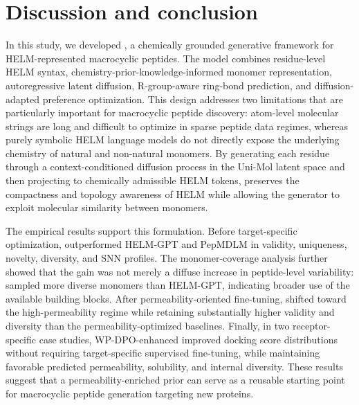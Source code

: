 \section{Discussion and conclusion}\label{sec:conclusion}

In this study, we developed \mytool, a chemically grounded generative framework for HELM-represented macrocyclic peptides. The model combines residue-level HELM syntax, chemistry-prior-knowledge-informed monomer representation, autoregressive latent diffusion, R-group-aware ring-bond prediction, and diffusion-adapted preference optimization. This design addresses two limitations that are particularly important for macrocyclic peptide discovery: atom-level molecular strings are long and difficult to optimize in sparse peptide data regimes, whereas purely symbolic HELM language models do not directly expose the underlying chemistry of natural and non-natural monomers. By generating each residue through a context-conditioned diffusion process in the Uni-Mol latent space and then projecting to chemically admissible HELM tokens, \mytool preserves the compactness and topology awareness of HELM while allowing the generator to exploit molecular similarity between monomers.

The empirical results support this formulation. Before target-specific optimization, \mytool outperformed HELM-GPT and PepMDLM in validity, uniqueness, novelty, diversity, and SNN profiles. The monomer-coverage analysis further showed that the gain was not merely a diffuse increase in peptide-level variability: \mytool sampled more diverse monomers than HELM-GPT, indicating broader use of the available building blocks. After permeability-oriented fine-tuning, \mytool shifted toward the high-permeability regime while retaining substantially higher validity and diversity than the permeability-optimized baselines. Finally, in two receptor-specific case studies, WP-DPO-enhanced \mytool improved docking score distributions without requiring target-specific supervised fine-tuning, while maintaining favorable predicted permeability, solubility, and internal diversity. These results suggest that a permeability-enriched \mytool prior can serve as a reusable starting point for macrocyclic peptide generation targeting new proteins.

